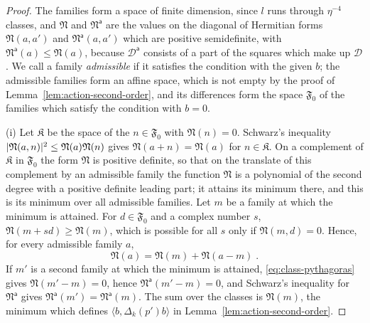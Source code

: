 \documentclass[11pt]{preprint}
\DeclarePairedDelimiter{\abs}{\lvert}{\rvert}
\numberwithin{equation}{section}
\theoremstyle{definition}
\theoremstyle{remark}
\theoremstyle{plain}
\begin{document}
\begin{proof}
The families form a space of finite dimension, since $l$ runs through $\eta^{-4}$ classes, and $\mathfrak N$ and $\mathfrak N^{\mathsf a}$ are the values on the diagonal of Hermitian forms $\mathfrak N(a, a')$ and $\mathfrak N^{\mathsf a}(a, a')$ which are positive semidefinite, with $\mathfrak N^{\mathsf a}(a) \leq \mathfrak N(a)$, because $\mathcal D^{\mathsf a}$ consists of a part of the squares which make up $\mathcal D$. We call a family \emph{admissible} if it satisfies the condition with the given $b$; the admissible families form an affine space, which is not empty by the proof of Lemma~\ref{lem:action-second-order}, and its differences form the space $\mathfrak F_0$ of the families which satisfy the condition with $b = 0$.

(i) Let $\mathfrak K$ be the space of the $n \in \mathfrak F_0$ with $\mathfrak N(n) = 0$. Schwarz's inequality $\abs{\mathfrak N(a, n)}^2 \leq \mathfrak N(a)\mathfrak N(n)$ gives $\mathfrak N(a + n) = \mathfrak N(a)$ for $n \in \mathfrak K$. On a complement of $\mathfrak K$ in $\mathfrak F_0$ the form $\mathfrak N$ is positive definite, so that on the translate of this complement by an admissible family the function $\mathfrak N$ is a polynomial of the second degree with a positive definite leading part; it attains its minimum there, and this is its minimum over all admissible families. Let $m$ be a family at which the minimum is attained. For $d \in \mathfrak F_0$ and a complex number $s$, $\mathfrak N(m + sd) \geq \mathfrak N(m)$, which is possible for all $s$ only if $\mathfrak N(m, d) = 0$. Hence, for every admissible family $a$,
\begin{equation}\label{eq:class-pythagoras}
    \mathfrak N(a) = \mathfrak N(m) + \mathfrak N(a - m)\;.
\end{equation}
If $m'$ is a second family at which the minimum is attained, \eqref{eq:class-pythagoras} gives $\mathfrak N(m' - m) = 0$, hence $\mathfrak N^{\mathsf a}(m' - m) = 0$, and Schwarz's inequality for $\mathfrak N^{\mathsf a}$ gives $\mathfrak N^{\mathsf a}(m') = \mathfrak N^{\mathsf a}(m)$. The sum over the classes is $\mathfrak N(m)$, the minimum which defines $\langle b, \Delta_k(p')b\rangle$ in Lemma~\ref{lem:action-second-order}.


\end{proof}
\end{document}
